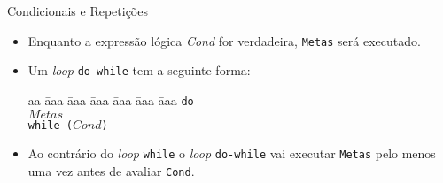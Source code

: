 \begin{frame}{Condicionais e Repetições}
\begin{itemize}
        \item Enquanto a expressão lógica \emph{Cond} for verdadeira, \texttt{Metas} será
        executado.
        
        \framebreak
        
        \item Um \textit{loop} \texttt{do-while} tem a seguinte forma:
        
        \begin{tabbing}
            aa \= aaa \= aaa \= aaa \= aaa \= aaa \= aaa \kill
            \> \texttt{do} \\
            \> \> $Metas$  \\
            \>  \texttt{while ($Cond$)}
        \end{tabbing} 
        
        \item Ao contrário do \textit{loop} \texttt{while} o \textit{loop} \texttt{do-while}
        vai executar \texttt{Metas} pelo menos uma vez antes de avaliar \texttt{Cond}.
        
    \end{itemize}
    
\end{frame}


